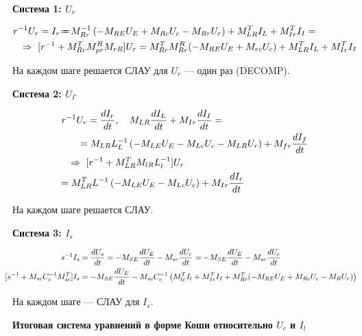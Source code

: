 	\textbf{Система 1: $U_r$}
	
	\begin{equation}
		\begin{aligned}
			r^{-1} U_r &= I_r = \hspace{-1em}= M_{Rr}^{-1} \left( -M_{RE} U_E + M_{Rc} U_c - M_{Rr} U_r \right) + M_{LR}^T I_L + M_{Ir}^T I_I = \\
			&\hspace{-2em} \Rightarrow\ [r^{-1} + M_{Rr}^T M_{pr}^R M_{rR}] U_r = M_{Rr}^T M_{Rr}^R (-M_{RE} U_E + M_{rc} U_c) + M_{LR}^T I_L + M_{Ir}^T I_I
		\end{aligned}
	\end{equation}
	
	На каждом шаге решается СЛАУ для $U_r$ — один раз (DECOMP).
	
	\textbf{Система 2: $U_\Gamma$}
	
	\begin{align}
		r^{-1} U_r &= \frac{d I_r}{dt},\quad M_{LR} \frac{d I_L}{dt} + M_{Ir} \frac{d I_I}{dt} = \\
		&\hspace{-1em}= M_{LR} L_L^{-1} \left( -M_{LE} U_E - M_{Lc} U_c - M_{LR} U_r \right) + M_{fr} \frac{d I_f}{dt} \\
		&\hspace{-2em}\Rightarrow\ [r^{-1} + M_{LR}^T M_{lR} L_l^{-1}] U_r \\
		&\hspace{-3em}= M_{LR}^T L^{-1} \left( -M_{LE} U_E - M_{Lc} U_c \right) + M_{Ir} \frac{d I_r}{dt}
	\end{align}
	
	На каждом шаге решается СЛАУ.
	
	\textbf{Система 3: $I_s$}
	
	\begin{align}
		\hspace{-1em}s^{-1} I_s &= \frac{d U_s}{dt} = -M_{SE} \frac{d U_E}{dt} - M_{sc} \frac{d U_c}{dt} = -M_{SE} \frac{d U_E}{dt} - M_{sc} \frac{d U_c}{dt} \\
		\hspace{-1em}[s^{-1} + M_{sc} C_c^{-1} M_{sc}^T] I_s &= -M_{SE} \frac{d U_E}{dt} - M_{sc} C_c^{-1} \left( M_{lc}^T I_l + M_{Ic}^T I_I + M_{Rc}^T (-M_{RE} U_E + M_{Rc} U_c - M_R U_r) \right)
	\end{align}
	
	На каждом шаге — СЛАУ для $I_s$.
	
	\textbf{Итоговая система уравнений в форме Коши относительно $U_c$ и $I_l$}
	
